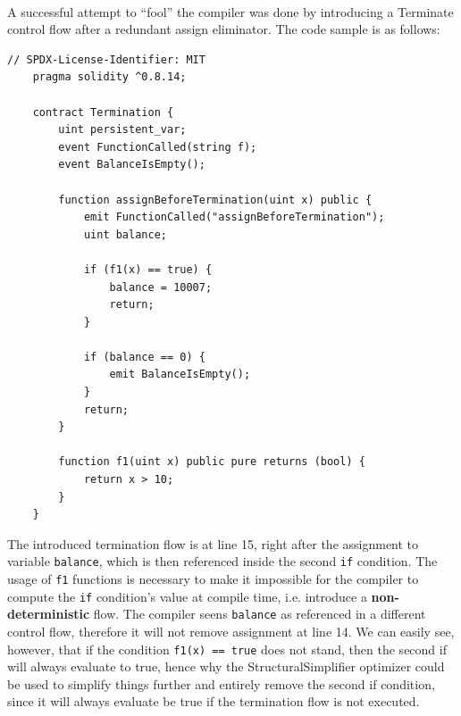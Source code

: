 \paragraph*{}
A successful attempt to ``fool'' the compiler was done by introducing a Terminate control flow after a redundant assign eliminator. The code sample is as follows:

\label{code:unused-assign-eliminator-handle-termination-flow}
\begin{lstlisting}[caption=YUL IR code sample for variable assignments. Both variables a and b are used in a different control flow.]
    // SPDX-License-Identifier: MIT
    pragma solidity ^0.8.14;
    
    contract Termination {
        uint persistent_var;
        event FunctionCalled(string f);
        event BalanceIsEmpty();
    
        function assignBeforeTermination(uint x) public {
            emit FunctionCalled("assignBeforeTermination");
            uint balance;
            
            if (f1(x) == true) {
                balance = 10007;
                return;
            }
    
            if (balance == 0) {
                emit BalanceIsEmpty();
            }
            return;
        }
    
        function f1(uint x) public pure returns (bool) {
            return x > 10;
        }
    }    
\end{lstlisting}

The introduced termination flow is at line 15, right after the assignment to variable \lstinline[columns=fixed]{balance}, which is then referenced inside the second \lstinline[columns=fixed]{if} condition. The usage of \lstinline[columns=fixed]{f1} functions is necessary to make it impossible for the compiler to compute the \lstinline[columns=fixed]{if} condition's value at compile time, i.e. introduce a \textbf{non-deterministic} flow. The compiler seens \lstinline[columns=fixed]{balance} as referenced in a different control flow, therefore it will not remove assignment at line 14. We can easily see, however, that if the condition \lstinline[columns=fixed]{f1(x) == true} does not stand, then the second if will always evaluate to true, hence why the StructuralSimplifier optimizer could be used to simplify things further and entirely remove the second if condition, since it will always evaluate be true if the termination flow is not executed.


